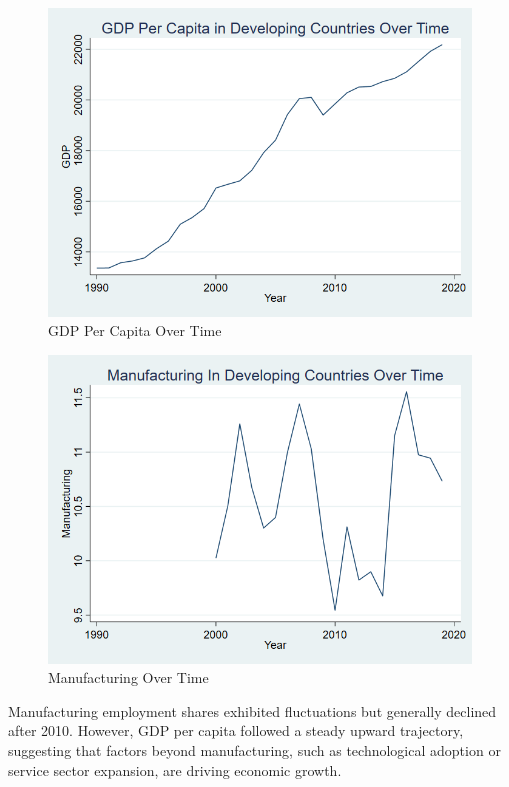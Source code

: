 \documentclass[12pt]{article}
\begin{document}
\begin{figure}
    \centering
    \includegraphics[width=0.5\linewidth]{GDP DEVELOPING GRAPH.png}
    \caption{GDP Per Capita Over Time}
    \label{fig:enter-label}
\end{figure}
\begin{figure}
    \centering
    \includegraphics[width=0.5\linewidth]{FINAL GRAPH MFT DEVELOPING.png}
    \caption{Manufacturing Over Time}
    \label{fig:enter-label}
\end{figure}
\item Manufacturing employment shares exhibited fluctuations but generally declined after 2010. However, GDP per capita followed a steady upward trajectory, suggesting that factors beyond manufacturing, such as technological adoption or service sector expansion, are driving economic growth.
\end{document}
